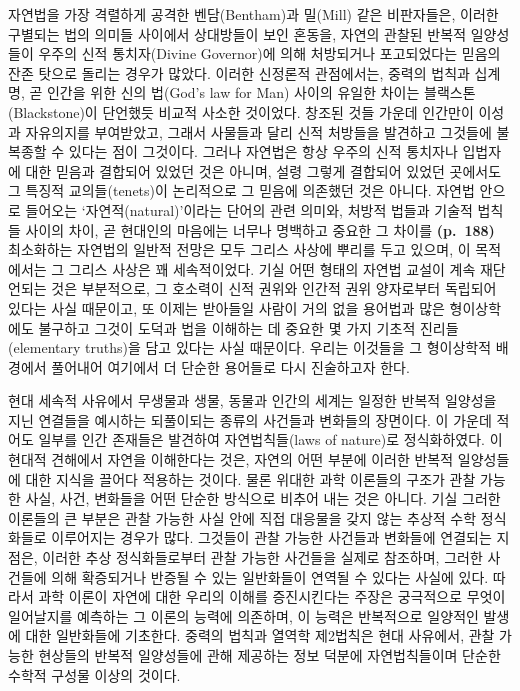 자연법을 가장 격렬하게 공격한 벤담(Bentham)과 밀(Mill) 같은 비판자들은,
이러한 구별되는 법의 의미들 사이에서 상대방들이 보인 혼동을, 자연의
관찰된 반복적 일양성들이 우주의 신적 통치자(Divine Governor)에 의해
처방되거나 포고되었다는 믿음의 잔존 탓으로 돌리는 경우가 많았다. 이러한
신정론적 관점에서는, 중력의 법칙과 십계명, 곧 인간을 위한 신의 법(God's
law for Man) 사이의 유일한 차이는 블랙스톤(Blackstone)이 단언했듯 비교적
사소한 것이었다. 창조된 것들 가운데 인간만이 이성과 자유의지를
부여받았고, 그래서 사물들과 달리 신적 처방들을 발견하고 그것들에
불복종할 수 있다는 점이 그것이다. 그러나 자연법은 항상 우주의 신적
통치자나 입법자에 대한 믿음과 결합되어 있었던 것은 아니며, 설령 그렇게
결합되어 있었던 곳에서도 그 특징적 교의들(tenets)이 논리적으로 그 믿음에
의존했던 것은 아니다. 자연법 안으로 들어오는 ‘자연적(natural)’이라는
단어의 관련 의미와, 처방적 법들과 기술적 법칙들 사이의 차이, 곧 현대인의
마음에는 너무나 명백하고 중요한 그 차이를 \textbf{(p.~188)} 최소화하는
자연법의 일반적 전망은 모두 그리스 사상에 뿌리를 두고 있으며, 이
목적에서는 그 그리스 사상은 꽤 세속적이었다. 기실 어떤 형태의 자연법
교설이 계속 재단언되는 것은 부분적으로, 그 호소력이 신적 권위와 인간적
권위 양자로부터 독립되어 있다는 사실 때문이고, 또 이제는 받아들일 사람이
거의 없을 용어법과 많은 형이상학에도 불구하고 그것이 도덕과 법을
이해하는 데 중요한 몇 가지 기초적 진리들(elementary truths)을 담고
있다는 사실 때문이다. 우리는 이것들을 그 형이상학적 배경에서 풀어내어
여기에서 더 단순한 용어들로 다시 진술하고자 한다.

현대 세속적 사유에서 무생물과 생물, 동물과 인간의 세계는 일정한 반복적
일양성을 지닌 연결들을 예시하는 되풀이되는 종류의 사건들과 변화들의
장면이다. 이 가운데 적어도 일부를 인간 존재들은 발견하여 자연법칙들(laws
of nature)로 정식화하였다. 이 현대적 견해에서 자연을 이해한다는 것은,
자연의 어떤 부분에 이러한 반복적 일양성들에 대한 지식을 끌어다 적용하는
것이다. 물론 위대한 과학 이론들의 구조가 관찰 가능한 사실, 사건,
변화들을 어떤 단순한 방식으로 비추어 내는 것은 아니다. 기실 그러한
이론들의 큰 부분은 관찰 가능한 사실 안에 직접 대응물을 갖지 않는 추상적
수학 정식화들로 이루어지는 경우가 많다. 그것들이 관찰 가능한 사건들과
변화들에 연결되는 지점은, 이러한 추상 정식화들로부터 관찰 가능한
사건들을 실제로 참조하며, 그러한 사건들에 의해 확증되거나 반증될 수 있는
일반화들이 연역될 수 있다는 사실에 있다. 따라서 과학 이론이 자연에 대한
우리의 이해를 증진시킨다는 주장은 궁극적으로 무엇이 일어날지를 예측하는
그 이론의 능력에 의존하며, 이 능력은 반복적으로 일양적인 발생에 대한
일반화들에 기초한다. 중력의 법칙과 열역학 제2법칙은 현대 사유에서, 관찰
가능한 현상들의 반복적 일양성들에 관해 제공하는 정보 덕분에
자연법칙들이며 단순한 수학적 구성물 이상의 것이다.

